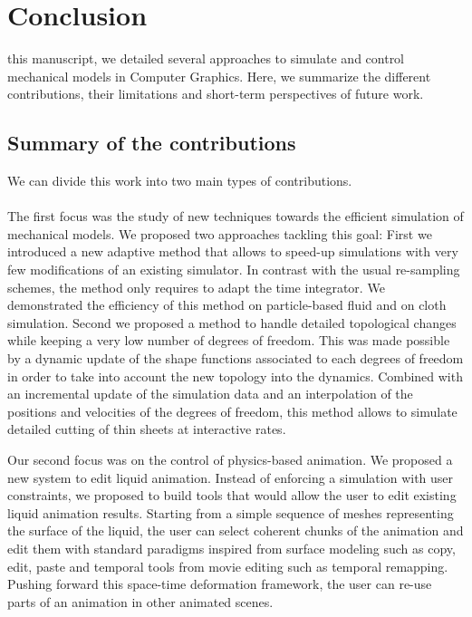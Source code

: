\chapter[Conclusion]{Conclusion}
\label{chap:conclusion}

 this manuscript, we detailed several approaches to simulate and control mechanical models in Computer Graphics. 
Here, we summarize the different contributions, their limitations and short-term perspectives of future work.

\section{Summary of the contributions}
We can divide this work into two main types of contributions.
\\ \\
The first focus was the study of new techniques towards the efficient simulation of mechanical models. 
We proposed two approaches tackling this goal: 
First we introduced a new adaptive method that allows to speed-up simulations with very few modifications of an existing simulator. 
In contrast with the usual re-sampling schemes, the method only requires to adapt the time integrator. 
We demonstrated the efficiency of this method on particle-based fluid and on cloth simulation.
Second we proposed a method to handle detailed topological changes while keeping a very low number of degrees of freedom. 
This was made possible by a dynamic update of the shape functions associated to each degrees of freedom in order to take into account the new topology into the dynamics. 
Combined with an incremental update of the simulation data and an interpolation of the positions and velocities of the degrees of freedom, this method allows to simulate detailed cutting of thin sheets at interactive rates.

Our second focus was on the control of physics-based animation. We proposed a new system to edit liquid animation. 
Instead of enforcing a simulation with user constraints, we proposed to build tools that would allow the user to edit existing liquid animation results. 
Starting from a simple sequence of meshes representing the surface of the liquid, the user can select coherent chunks of the animation and edit them with standard paradigms inspired from surface modeling such as copy, edit, paste and temporal tools from movie editing such as temporal remapping. 
Pushing forward this space-time deformation framework, the user can re-use parts of an animation in other animated scenes.

